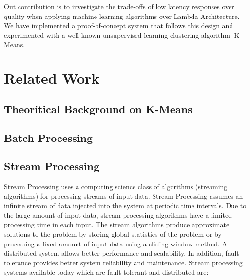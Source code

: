 \documentclass{lmproj}
\begin{document}
Out contribution is to investigate the trade-offs of low latency responses over quality when applying machine learning algorithms over Lambda Architecture. We have implemented a proof-of-concept system that follows this design and experimented with a well-known unsupervised learning clustering algorithm, K-Means. 


\chapter{Related Work}
\label{relatedwork}

\section{Theoritical Background on K-Means}
\label{relatedwork}

\section{Batch Processing}
\label{relatedwork}

\section{Stream Processing}
\label{relatedwork}

Stream Processing uses a computing science class of algorithms (streaming algorithms) for processing streams of input data. Stream Processing assumes an infinite stream of data injected into the system at periodic time intervals. Due to the large amount of input data, stream processing algorithms have a limited processing time in each input.  The stream algorithms produce approximate solutions to the problem by storing global statistics of the problem or by processing a fixed amount of input data using a sliding window method.
A distributed system allows better performance and scalability. In addition, fault tolerance provides better system reliability and maintenance. Stream processing systems available today which are fault tolerant and distributed are:
\end{document}

